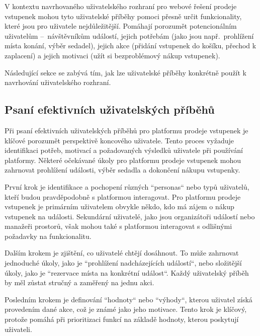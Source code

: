 V kontextu navrhovaného uživatelského rozhraní pro webové řešení prodeje vstupenek mohou tyto uživatelské příběhy pomoci přesně určit funkcionality, které jsou pro uživatele nejdůležitější.
Pomáhají porozumět potencionálním uživatelům –~návštěvníkům událostí, jejich potřebám (jako jsou např.\ prohlížení místa konání, výběr sedadel), jejich akce (přidání vstupenek do košíku, přechod k zaplacení) a jejich motivaci (užít si bezproblémový nákup vstupenek).

Následující sekce se zabývá tím, jak lze uživatelské příběhy konkrétně použít k navrhování uživatelského rozhraní.

\subsection{Psaní efektivních uživatelských příběhů}
\label{subsec:navrh-ui-uzivatelske-pribehy-psani-efektivnich}

Při psaní efektivních uživatelských příběhů pro platformu prodeje vstupenek je klíčové porozumět perspektivě koncového uživatele.
Tento proces vyžaduje identifikaci potřeb, motivací a požadovaných výsledků uživatele při používání platformy.
Některé očekávané úkoly pro platformu prodeje vstupenek mohou zahrnovat prohlížení události, výběr sedadla a dokončení nákupu vstupenky.

První krok je identifikace a pochopení různých ``personas`` nebo typů uživatelů, kteří budou pravděpodobně s platformou interagovat.
Pro platformu prodeje vstupenek je primárním uživatelem obvykle někdo, kdo má zájem o nákup vstupenek na události.
Sekundární uživatelé, jako jsou organizátoři událostí nebo manažeři prostorů, však mohou také s platformou interagovat s odlišnými požadavky na funkcionalitu.

Dalším krokem je zjištění, co uživatelé chtějí dosáhnout.
To může zahrnovat jednoduché úkoly, jako je ``prohlížení nadcházejících událostí``, nebo složitější úkoly, jako je ``rezervace místa na konkrétní událost``.
Každý uživatelský příběh by měl zůstat stručný a zaměřený na jednu akci.

Posledním krokem je definování ``hodnoty`` nebo ``výhody``, kterou uživatel získá provedením dané akce, což je známé jako jeho motivace.
Tento krok je klíčový, protože pomáhá při prioritizaci funkcí na základě hodnoty, kterou poskytují uživateli.

